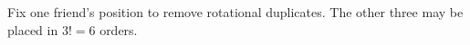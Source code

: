 Fix one friend's position to remove rotational duplicates. The other three may be placed in $3!=\boxed6$ orders.
